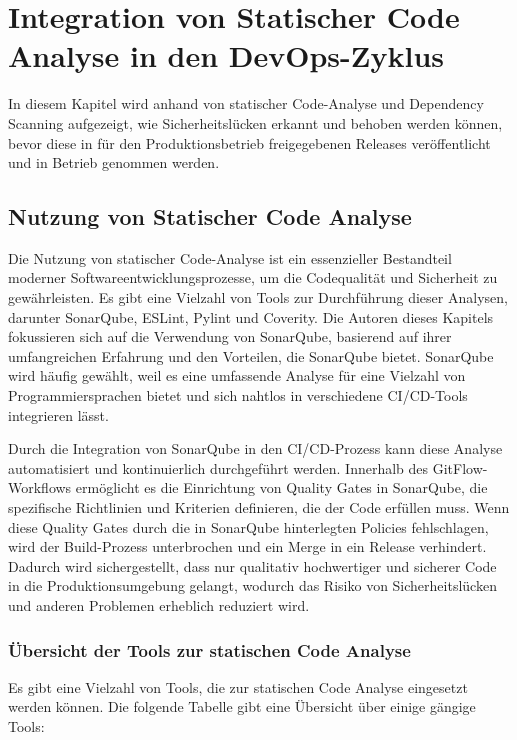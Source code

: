 \section{Integration von Statischer Code Analyse in den DevOps-Zyklus}
In diesem Kapitel wird anhand von statischer Code-Analyse und Dependency Scanning aufgezeigt, wie Sicherheitslücken erkannt und behoben werden können, bevor diese in für den Produktionsbetrieb freigegebenen Releases veröffentlicht und in Betrieb genommen werden.

\subsection{Nutzung von Statischer Code Analyse}
Die Nutzung von statischer Code-Analyse ist ein essenzieller Bestandteil moderner Softwareentwicklungsprozesse, um die Codequalität und Sicherheit zu gewährleisten. Es gibt eine Vielzahl von Tools zur Durchführung dieser Analysen, darunter SonarQube, ESLint, Pylint und Coverity. Die Autoren dieses Kapitels fokussieren sich auf die Verwendung von SonarQube, basierend auf ihrer umfangreichen Erfahrung und den Vorteilen, die SonarQube bietet. SonarQube wird häufig gewählt, weil es eine umfassende Analyse für eine Vielzahl von Programmiersprachen bietet und sich nahtlos in verschiedene CI/CD-Tools integrieren lässt.

Durch die Integration von SonarQube in den CI/CD-Prozess kann diese Analyse automatisiert und kontinuierlich durchgeführt werden. Innerhalb des GitFlow-Workflows ermöglicht es die Einrichtung von Quality Gates in SonarQube, die spezifische Richtlinien und Kriterien definieren, die der Code erfüllen muss. Wenn diese Quality Gates durch die in SonarQube hinterlegten Policies fehlschlagen, wird der Build-Prozess unterbrochen und ein Merge in ein Release verhindert. Dadurch wird sichergestellt, dass nur qualitativ hochwertiger und sicherer Code in die Produktionsumgebung gelangt, wodurch das Risiko von Sicherheitslücken und anderen Problemen erheblich reduziert wird.

\subsubsection{Übersicht der Tools zur statischen Code Analyse}

Es gibt eine Vielzahl von Tools, die zur statischen Code Analyse eingesetzt werden können. Die folgende Tabelle gibt eine Übersicht über einige gängige Tools:

